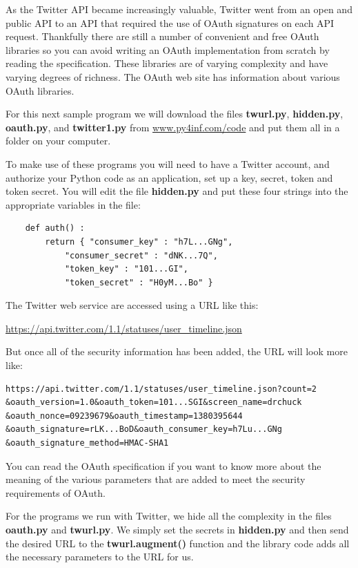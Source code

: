 As the Twitter API became increasingly valuable, Twitter
went from an open and public API to an API that required
the use of OAuth signatures on each API request. Thankfully
there are still a number of convenient and free OAuth libraries
so you can avoid writing an OAuth implementation from scratch
by reading the specification.  These libraries are of 
varying complexity and have varying degrees of
richness.  The OAuth web site has information about various 
OAuth libraries.

For this next sample program we will download the files 
{\bf twurl.py}, {\bf hidden.py}, 
{\bf oauth.py}, 
and
{\bf twitter1.py} from 
\url{www.py4inf.com/code} and put them all in a folder
on your computer.

To make use of these programs you will need to have a Twitter
account, and authorize your Python code as an application,
set up a key, secret, token and token secret.  You will edit
the file {\bf hidden.py} and put these four strings into the
appropriate variables in the file:

\beforeverb
\begin{verbatim}
    def auth() :
        return { "consumer_key" : "h7L...GNg",
            "consumer_secret" : "dNK...7Q",
            "token_key" : "101...GI",
            "token_secret" : "H0yM...Bo" }
\end{verbatim}
\afterverb
%
The Twitter web service are accessed using a URL like this:

\url{https://api.twitter.com/1.1/statuses/user_timeline.json}

But once all of the security information has been added, the URL
will look more like:

\beforeverb
\begin{verbatim}
https://api.twitter.com/1.1/statuses/user_timeline.json?count=2
&oauth_version=1.0&oauth_token=101...SGI&screen_name=drchuck
&oauth_nonce=09239679&oauth_timestamp=1380395644
&oauth_signature=rLK...BoD&oauth_consumer_key=h7Lu...GNg
&oauth_signature_method=HMAC-SHA1
\end{verbatim}
\afterverb
%
You can read the OAuth specification if you want to
know more about the meaning of the various parameters that
are added to meet the security requirements of OAuth.  

For the programs we run with Twitter, we hide all the 
complexity in the files {\bf oauth.py} and {\bf twurl.py}.
We simply set the secrets in {\bf hidden.py} and then 
send the desired URL to the {\bf twurl.augment()} 
function and the library code adds all the necessary 
parameters to the URL for us.

